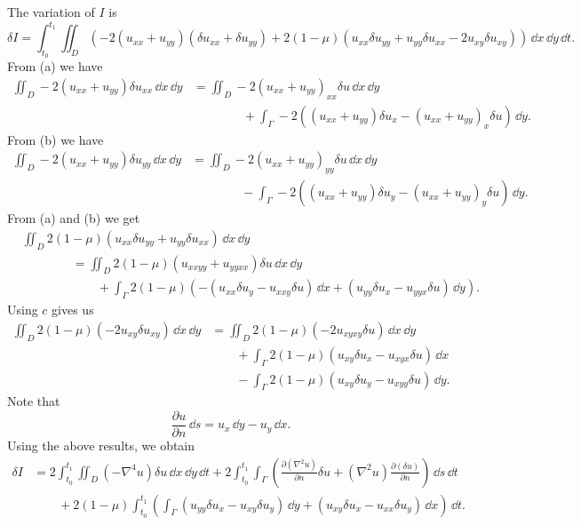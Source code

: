 \begin{Solution}
  The variation of $I$ is
  \[
  \delta I = \int_{t_0}^{t_1} \iint_D \left( -2 (u_{x x} + u_{y y})
    ( \delta u_{x x} + \delta u_{y y} ) + 2 (1 - \mu) 
    ( u_{x x} \delta u_{y y} + u_{y y} \delta u_{x x} 
    - 2 u_{x y} \delta u_{x y} ) \right) \,\dd x\,\dd y\,\dd t.
  \]
  From (a) we have
  \begin{align*}
    \iint_D -2 (u_{x x} + u_{y y}) \delta u_{x x} \,\dd x\,\dd y
    &= \iint_D -2 (u_{x x} + u_{y y})_{x x} \delta u \,\dd x\,\dd y \\
    &\qquad\qquad + \int_\Gamma -2 ( (u_{x x} + u_{y y}) \delta u_x
    - (u_{x x} + u_{y y})_x \delta u ) \,\dd y.
  \end{align*}
  From (b) we have
  \begin{align*}
    \iint_D -2 (u_{x x} + u_{y y}) \delta u_{y y} \,\dd x\,\dd y
    &= \iint_D -2 (u_{x x} + u_{y y})_{y y} \delta u \,\dd x\,\dd y \\
    &\qquad \qquad - \int_\Gamma -2 ( (u_{x x} + u_{y y}) \delta u_y
    - (u_{x x} + u_{y y})_y \delta u ) \,\dd y.
  \end{align*}
  From (a) and (b) we get
  \begin{align*}
    &\iint_D 2 (1 - \mu) (u_{x x} \delta u_{y y} + u_{y y} \delta u_{x x} )
    \,\dd x\,\dd y \\
    &\qquad \qquad
    = \iint_D 2 (1 - \mu) (u_{x x y y} + u_{y y x x}) \delta u \,\dd x\,\dd y \\
    &\qquad\qquad\qquad
    + \int_\Gamma 2 (1 - \mu) ( -( u_{x x} \delta u_y - u_{x x y} \delta u )\,\dd x
    + (u_{y y} \delta u_x - u_{y y x} \delta u )\,\dd y ).
  \end{align*}
  Using $c$ gives us
  \begin{align*}
    \iint_D 2 (1 - \mu) ( -2 u_{x y} \delta u_{x y} ) \,\dd x\,\dd y
    &= \iint_D 2 (1 - \mu) (-2 u_{x y x y} \delta u) \,\dd x\,\dd y \\
    &\qquad
    + \int_\Gamma 2 (1 - \mu) ( u_{x y} \delta u_x - u_{x y x} \delta u)\,\dd x \\
    &\qquad
    - \int_\Gamma 2 (1 - \mu) ( u_{x y} \delta u_y - u_{x y y} \delta u)\,\dd y.
  \end{align*}
  Note that
  \[
  \frac{\partial u}{\partial n} \,\dd s = u_x \,\dd y - u_y \,\dd x.
  \]
  Using the above results, we obtain
  \begin{align*}
    \delta I
    &= 2 \int_{t_0}^{t_1} \iint_D (- \nabla^4 u )\delta u\,\dd x\,\dd y\,\dd t
    + 2 \int_{t_0}^{t_1} \int_\Gamma \left( \frac{\partial (\nabla^2 u)}{\partial n}
      \delta u + (\nabla^2 u) \frac{\partial (\delta u)}{\partial n} \right)\,\dd s\,\dd t \\
    &\qquad + 2 (1-\mu) \int_{t_0}^{t_1} \left( \int_\Gamma
      (u_{y y} \delta u_x - u_{x y} \delta u_y )\,\dd y
      + (u_{x y} \delta u_x - u_{x x} \delta u_y)\,\dd x \right) \,\dd t.
  \end{align*}
\end{Solution}



